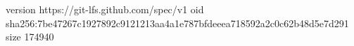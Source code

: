 version https://git-lfs.github.com/spec/v1
oid sha256:7be47267c1927892c9121213aa4a1e787bfdeeea718592a2c0c62b48d5e7d291
size 174940
